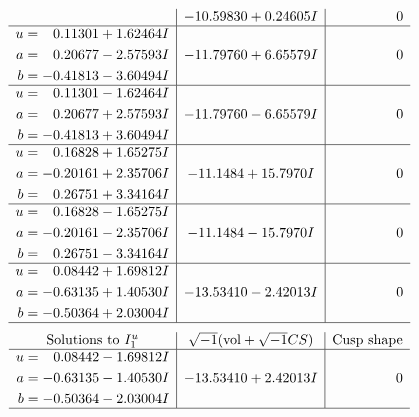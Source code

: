 \documentclass[1p]{elsarticle_modified}
\theoremstyle{definition}
\newcommand{\I}{\sqrt{-1}}
\begin{document}
$$\begin{array}{c|c|c}
 & -10.59830 + 0.24605 I & \phantom{-0.000000 } 0 \\ \hline\begin{aligned}
u &= \phantom{-}0.11301 + 1.62464 I \\
a &= \phantom{-}0.20677 - 2.57593 I \\
b &= -0.41813 - 3.60494 I\end{aligned}
 & -11.79760 + 6.65579 I & \phantom{-0.000000 } 0 \\ \hline\begin{aligned}
u &= \phantom{-}0.11301 - 1.62464 I \\
a &= \phantom{-}0.20677 + 2.57593 I \\
b &= -0.41813 + 3.60494 I\end{aligned}
 & -11.79760 - 6.65579 I & \phantom{-0.000000 } 0 \\ \hline\begin{aligned}
u &= \phantom{-}0.16828 + 1.65275 I \\
a &= -0.20161 + 2.35706 I \\
b &= \phantom{-}0.26751 + 3.34164 I\end{aligned}
 & -11.1484 + 15.7970 I & \phantom{-0.000000 } 0 \\ \hline\begin{aligned}
u &= \phantom{-}0.16828 - 1.65275 I \\
a &= -0.20161 - 2.35706 I \\
b &= \phantom{-}0.26751 - 3.34164 I\end{aligned}
 & -11.1484 - 15.7970 I & \phantom{-0.000000 } 0 \\ \hline\begin{aligned}
u &= \phantom{-}0.08442 + 1.69812 I \\
a &= -0.63135 + 1.40530 I \\
b &= -0.50364 + 2.03004 I\end{aligned}
 & -13.53410 - 2.42013 I & \phantom{-0.000000 } 0\\
 \hline 
 \end{array}$$\newpage$$\begin{array}{c|c|c}  
\text{Solutions to }I^u_{1}& \I (\text{vol} + \sqrt{-1}CS) & \text{Cusp shape}\\
 \hline 
\begin{aligned}
u &= \phantom{-}0.08442 - 1.69812 I \\
a &= -0.63135 - 1.40530 I \\
b &= -0.50364 - 2.03004 I\end{aligned}
 & -13.53410 + 2.42013 I & \phantom{-0.000000 } 0\\
 \hline 
 \end{array}$$\newpage\newpage\renewcommand{\arraystretch}{1}
\end{document}
